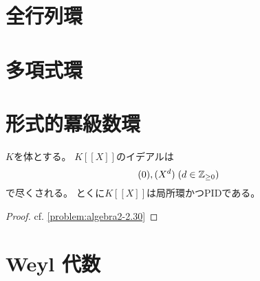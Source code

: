 \documentclass[report]{jlreq}
\begin{document}
%
\section{全行列環}

%
\section{多項式環}

%
\section{形式的冪級数環}

\begin{definition}
\end{definition}

\begin{proposition}
    $K$を体とする。
    $K[[X]]$のイデアルは
    \begin{equation}
        (0), (X^d)\; (d \in \mathbb{Z}_{\ge 0})
    \end{equation}
    で尽くされる。
    とくに$K[[X]]$は局所環かつPIDである。
\end{proposition}

\begin{proof}
    cf. \cref{problem:algebra2-2.30}
\end{proof}



%
\section{Weyl 代数}
\end{document}
